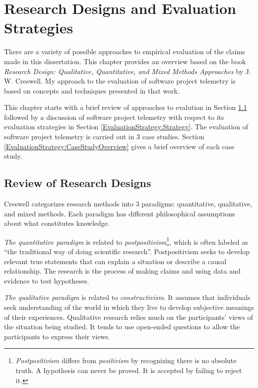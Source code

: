 \chapter{Research Designs and Evaluation Strategies}
\label{Chapter:EvaluationStrategy}


There are a variety of possible approaches to empirical evaluation of the claims made in this dissertation. This chapter provides an overview based on the book \textit{Research Design: Qualitative, Quantitative, and Mixed Methods Approaches} \cite{Creswell:2003} by J. W. Creswell. My approach to the evaluation of software project telemetry is based on concepts and techniques presented in that work.  

This chapter starts with a brief review of approaches to evalution in Section \ref{EvaluationStrategy:Review} followed by a discussion of software project telemetry with respect to its evaluation strategies in Section \ref{EvaluationStrategy:Strategy}. The evaluation of software project telemetry is carried out in 3 case studies. Section \ref{EvaluationStrategy:CaseStudyOverview} gives a brief overview of each case study.


%
%

\section{Review of Research Designs} \label{EvaluationStrategy:Review}

Creswell \cite{Creswell:2003} categorizes research methods into 3 paradigms: quantitative, qualitative, and mixed methods. Each paradigm has different philosophical assumptions about what constitutes knowledge.

\textit {The quantitative paradigm} is related to \textit{postpositivism}\footnote{\textit{Postpositivism} differs from \textit{positivism} by recognizing there is no absolute truth. A hypothesis can never be proved. It is accepted by failing to reject it.}, which is often labeled as ``the traditional way of doing scientific research''. Postpositivism seeks to develop relevant true statements that can explain a situation or describe a causal relationship. The research is the process of making claims and using data and evidence to test hypotheses.

\textit{The qualitative paradigm} is related to \textit{constructivism}. It assumes that individuals seek understanding of the world in which they live to develop subjective meanings of their experiences. Qualitative research relies much on the participants' views of the situation being studied. It tends to use open-ended questions to allow the participants to express their views. 

